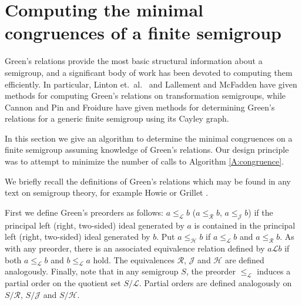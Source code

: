 \documentclass{acmconf}
\begin{document}
\section{Computing the minimal congruences of a finite 
semigroup} \label{S:semicong}
Green's relations provide the most basic structural information about a 
semigroup, and a significant body of work has been devoted to computing them
efficiently. In particular, Linton et.~al.~\cite{linton} and 
Lallement and McFadden \cite{lallement} have given methods for computing
Green's relations on transformation semigroups, while 
Cannon \cite{cannon} and Pin and Froidure \cite{pin} have 
given methods for determining Green's relations for a 
generic finite semigroup using its Cayley graph.

In this section we give an algorithm to determine  the minimal congruences 
on a finite semigroup assuming knowledge of Green's relations. Our
design principle was to attempt to minimize the number of 
calls to Algorithm \ref{A:congruence}.

We briefly recall the definitions of Green's relations which may be 
found in any text on semigroup theory, for example Howie \cite{bH76} or
Grillet \cite{bG95}.

First we define Green's preorders as follows:
$a \leq_\mathscr{L} b$ ($a \leq_\mathscr{R} b$, $a \leq_\mathscr{J} b$) 
if the principal left (right, two-sided) ideal generated by $a$ is contained
in the principal left (right, two-sided) ideal generated by $b$.  
Put $a \leq_\mathscr{H} b$ if $a \leq_\mathscr{L} b$ and 
$a \leq_\mathscr{R} b$. 
As with any preorder, there is an associated equivalence relation
defined by $a \mathscr{L} b$ if both $a \leq_\mathscr{L} b$
and $b \leq_\mathscr{L} a$ hold. The equivalences 
$\mathscr{R}$, $\mathscr{J}$ and $\mathscr{H}$ are defined analogously.
Finally, note that in any semigroup $S$, the preorder $\leq_\mathscr{L}$
induces a partial order on the quotient set $S/\mathscr{L}$. 
Partial orders  are defined analogously on $S/\mathscr{R}$, $S/\mathscr{J}$
and $S/\mathscr{H}$.
\end{document}
